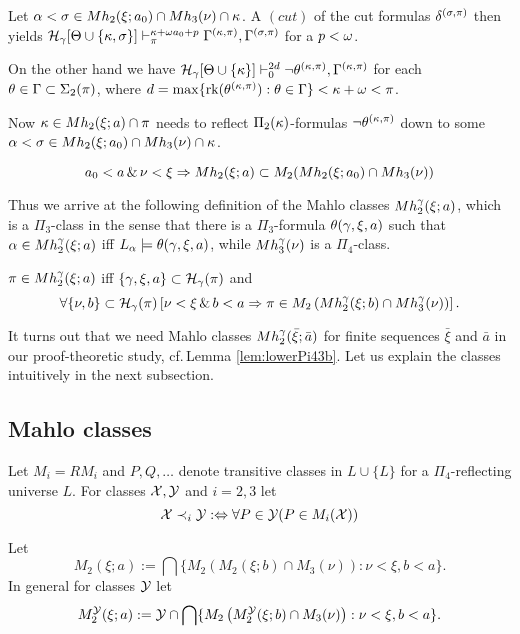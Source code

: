 \documentclass{article}
\begin{document}
Let
$
\alpha<\sigma\in Mh_{2}(\xi;a_{0})\cap Mh_{3}(\nu)\cap \kappa$.
A $(cut)$ of the cut formulas $\delta^{(\sigma,\pi)}$ then yields
$\mathcal{H}_{\gamma}[\Theta\cup\{\kappa,\sigma\}]\vdash^{\kappa+\omega a_{0}+p}_{\pi}\Gamma^{(\kappa,\pi)},\Gamma^{(\sigma,\pi)}$ for a $p<\omega$.

On the other hand we have 
$\mathcal{H}_{\gamma}[\Theta\cup\{\kappa\}]\vdash^{2d}_{0}\lnot\theta^{(\kappa,\pi)},\Gamma^{(\kappa,\pi)}$
for each $\theta\in\Gamma\subset\Sigma_{2}(\pi)$, where
$d=\max\{\mbox{{\rm rk}}(\theta^{(\kappa,\pi)}):\theta\in\Gamma\}<\kappa+\omega<\pi$.

Now $\kappa\in Mh_{2}(\xi;a)\cap \pi$
needs to reflect $\Pi_{2}(\kappa)$-formulas
$\lnot\theta^{(\kappa,\pi)}$ down to some $\alpha<\sigma\in Mh_{2}(\xi;a_{0})\cap Mh_{3}(\nu)\cap \kappa$.


\[
a_{0}<a \,\&\, \nu<\xi \Rightarrow
Mh_{2}(\xi;a)\subset M_{2}(Mh_{2}(\xi;a_{0})\cap Mh_{3}(\nu))
\]

Thus we arrive at the following definition of the Mahlo classes $Mh_{2}^{\gamma}(\xi;a)$,
which is a $\Pi_{3}$-class in the sense that
there is a $\Pi_{3}$-formula $\theta(\gamma,\xi,a)$ such that
$\alpha\in Mh_{2}^{\gamma}(\xi;a)$  iff $L_{\alpha}\models \theta(\gamma,\xi,a)$,
while $Mh_{3}^{\gamma}(\nu)$ is a $\Pi_{4}$-class.






$\pi\in Mh_{2}^{\gamma}(\xi;a)$ iff $\{\gamma,\xi, a\}\subset{\cal H}_{\gamma}(\pi)$ and 
\[
\forall \{\nu,b\}\subset{\cal H}_{\gamma}(\pi)\left[\nu<\xi \,\&\, b<a  \Rightarrow
\pi\in M_{2}\left(
Mh_{2}^{\gamma}(\xi;b)\cap Mh_{3}^{\gamma}(\nu)
\right)
\right]
.\]


It turns out that we need Mahlo classes $Mh_{2}^{\gamma}(\bar{\xi};\bar{a})$
for finite sequences $\bar{\xi}$ and $\bar{a}$ in our proof-theoretic study, 
cf.\,Lemma \ref{lem:lowerPi43b}.
Let us explain the classes intuitively in the next subsection.

\subsection{Mahlo classes}\label{subsec:Mclasspi3}
Let $M_{i}=RM_{i}$ and
$P,Q,\ldots$ denote transitive classes in $L\cup\{L\}$ for a $\Pi_{4}$-reflecting universe $L$.
For classes ${\cal X},{\cal Y}$ and $i=2,3$ let
\[
{\cal X}\prec_{i}{\cal Y} :\Leftrightarrow
\forall P\in{\cal Y}(P\in M_{i}({\cal X}))
\]




\bdf
{\rm Let
\[
M_{2}(\xi;a):= 
\bigcap\{M_{2}\left(M_{2}(\xi;b)\cap M_{3}(\nu)\right):
\nu<\xi, b<a\}
.\]
In general for classes ${\cal Y}$ let
\[
M_{2}^{{\cal Y}}(\xi;a):= {\cal Y}\cap
\bigcap\{M_{2}\left(M_{2}^{{\cal Y}}(\xi;b)\cap M_{3}(\nu)\right):
\nu<\xi, b<a\}
.\]
}
\edf
\end{document}
